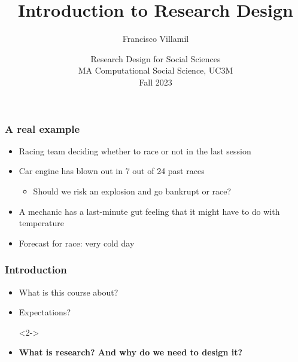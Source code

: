 \documentclass[aspectratio=43]{beamer}
\title[Lecture 1: Introduction to Research Design]{\Large Introduction to Research Design}
\author[]{Francisco Villamil}
\date[]{Research Design for Social Sciences\\MA Computational Social Science, UC3M\\Fall 2023}
\begin{document}

\begin{frame}

  \titlepage

\end{frame}

\begin{frame}
\frametitle{A real example}
\centering

\begin{itemize}
  \item Racing team deciding whether to race or not in the last session
  \item Car engine has blown out in 7 out of 24 past races
  \begin{itemize}
    \item Should we risk an explosion and go bankrupt or race?
  \end{itemize}
  \item A mechanic has a last-minute gut feeling that it might have to do with temperature
  \item Forecast for race: very cold day
\end{itemize}

\end{frame}




\begin{frame}
\frametitle{Introduction}
\centering

\begin{itemize}
  \item<1-> What is this course about?
  \item<1-> Expectations?
  \item[]<2->
  \item<2-> \textbf{What is research? And why do we need to design it?}
\end{itemize}

\end{frame}
\end{document}

